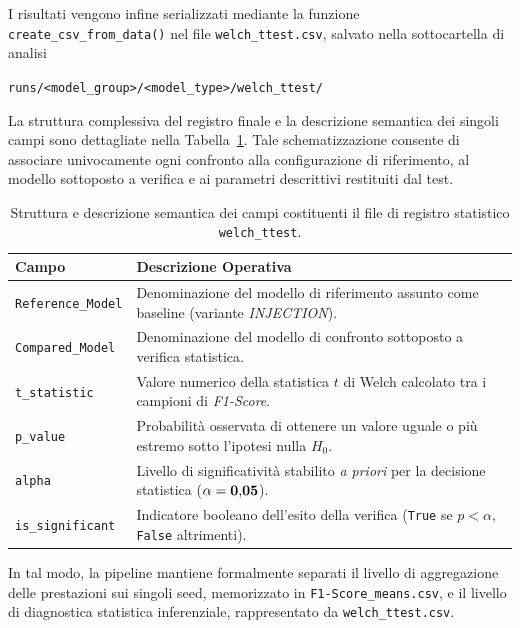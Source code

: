 I risultati vengono infine serializzati mediante la funzione \texttt{create\_csv\_from\_data()} nel file \texttt{welch\_ttest.csv}, salvato nella sottocartella di analisi 

\begin{center}
    \texttt{runs/<model\_group>/<model\_type>/welch\_ttest/}
\end{center}

La struttura complessiva del registro finale e la descrizione semantica dei singoli campi sono dettagliate nella Tabella~\ref{tab:welch_csv_structure}. Tale schematizzazione consente di associare univocamente ogni confronto alla configurazione di riferimento, al modello sottoposto a verifica e ai parametri descrittivi restituiti dal test.

\begin{table}[H]
    \centering
    \small
    \caption{Struttura e descrizione semantica dei campi costituenti il file di registro statistico \texttt{welch\_ttest}.}
    \label{tab:welch_csv_structure}
    \begin{tabularx}{\textwidth}{l >{\raggedright\arraybackslash}X}
        \toprule
        \textbf{Campo} & \textbf{Descrizione Operativa} \\
        \midrule
        \texttt{Reference\_Model} & Denominazione del modello di riferimento assunto come baseline (variante \textit{INJECTION}). \\
        \texttt{Compared\_Model} & Denominazione del modello di confronto sottoposto a verifica statistica. \\
        \texttt{t\_statistic} & Valore numerico della statistica $t$ di Welch calcolato tra i campioni di \textit{F1-Score}. \\
        \texttt{p\_value} & Probabilità osservata di ottenere un valore uguale o più estremo sotto l'ipotesi nulla $H_0$. \\
        \texttt{alpha} & Livello di significatività stabilito \textit{a priori} per la decisione statistica ($\bf{\alpha = 0{,}05}$). \\
        \texttt{is\_significant} & Indicatore booleano dell'esito della verifica (\texttt{True} se $p < \alpha$, \texttt{False} altrimenti). \\
        \bottomrule
    \end{tabularx}
\end{table}

In tal modo, la pipeline mantiene formalmente separati il livello di aggregazione delle prestazioni sui singoli seed, memorizzato in \texttt{F1-Score\_means.csv}, e il livello di diagnostica statistica inferenziale, rappresentato da \texttt{welch\_ttest.csv}.


